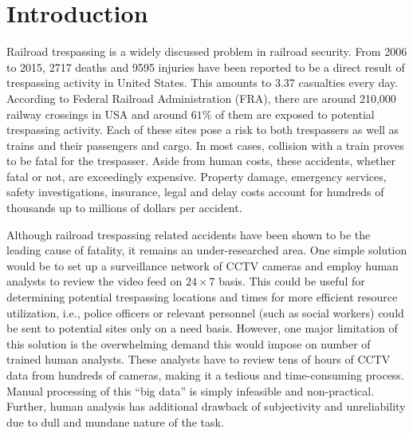 \section{Introduction}
Railroad trespassing is a widely discussed problem in railroad security. From 2006 to 2015, 2717 deaths and 9595 injuries have been reported to be a direct result of trespassing activity in United States\cite{zhang2018automated}. This amounts to 3.37 casualties every day. According to Federal Railroad Administration (FRA), there are around 210,000 railway crossings in USA and around $61\%$ of them are exposed to potential trespassing activity\cite{zhang2018automated}. Each of these sites pose a risk to both trespassers as well as trains and their passengers and cargo. In most cases, collision with a train proves to be fatal for the trespasser. Aside from human costs, these accidents, whether fatal or not, are exceedingly expensive. Property damage, emergency services, safety investigations, insurance, legal and delay costs account for hundreds of thousands up to millions of dollars per accident\cite{goldberg1998train}. 

Although railroad trespassing related accidents have been shown to be the leading cause of fatality\cite{pelletier1997deaths,matzopoulos1998hours,lobb2003evaluation,evans2003accidental}, it remains an under-researched area\cite{lobb2006trespassing}. One simple solution would be to set up a surveillance network of CCTV cameras and employ human analysts to review the video feed on $24 \times 7$
basis. This could be useful for determining potential trespassing locations and times for more efficient resource utilization, i.e., police officers or relevant personnel (such as social workers) could be sent to potential sites only on a need basis. However, one major limitation of this solution is the overwhelming demand this would impose on number of trained human analysts. These analysts have to review tens of hours of CCTV data from hundreds of cameras, making it a tedious and time-consuming process. Manual processing of this ``big data'' is simply infeasible and non-practical. Further, human analysis has additional drawback of subjectivity and unreliability due to dull and mundane nature of the task\cite{norouznezhad2008high}.

